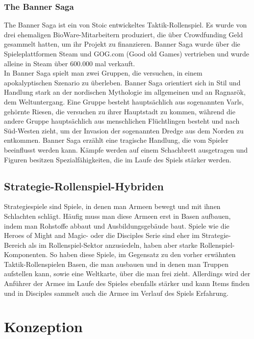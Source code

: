 \documentclass[extern,palatino]{cgBA}
\begin{document}
	\subsubsection{The Banner Saga}
	The Banner Saga ist ein von Stoic entwickeltes Taktik-Rollenspiel. Es wurde von drei ehemaligen BioWare-Mitarbeitern produziert, die über Crowdfunding Geld gesammelt hatten, um ihr Projekt zu finanzieren. Banner Saga wurde über die Spieleplattformen Steam und GOG.com (Good old Games) vertrieben und wurde alleine in Steam über 600.000 mal verkauft.
	\\In Banner Saga spielt man zwei Gruppen, die versuchen, in einem apokalyptischen Szenario zu überleben. Banner Saga orientiert sich in Stil und Handlung stark an der nordischen Mythologie im allgemeinen und an Ragnarök, dem Weltuntergang. Eine Gruppe besteht hauptsächlich aus sogenannten Varls, gehörnte Riesen, die versuchen zu ihrer Hauptstadt zu kommen, während die andere Gruppe hauptsächlich aus menschlichen Flüchtlingen besteht und nach Süd-Westen zieht, um der Invasion der sogenannten Dredge aus dem Norden zu entkommen.
	Banner Saga erzählt eine tragische Handlung, die vom Spieler beeinflusst werden kann. Kämpfe werden auf einem Schachbrett ausgetragen und Figuren besitzen Spezialfähigkeiten, die im Laufe des Spiels stärker werden. 
	\subsection{Strategie-Rollenspiel-Hybriden} Strategiespiele sind Spiele, in denen man Armeen bewegt und mit ihnen Schlachten schlägt. Häufig muss man diese Armeen erst in Basen aufbauen, indem man Rohstoffe abbaut und Ausbildungsgebäude baut. Spiele wie die Heroes of Might and Magic- oder die Disciples Serie sind eher im Strategie-Bereich als im Rollenspiel-Sektor anzusiedeln, haben aber starke Rollenspiel-Komponenten. So haben diese Spiele, im Gegensatz zu den vorher erwähnten Taktik-Rollenspielen Basen, die man ausbauen und in denen man Truppen aufstellen kann, sowie eine Weltkarte, über die man frei zieht. Allerdings wird der Anführer der Armee im Laufe des Spieles ebenfalls stärker und kann Items finden und in Disciples sammelt auch die Armee im Verlauf des Spiels Erfahrung.
	
	\newpage
\section {Konzeption}
\end{document}

